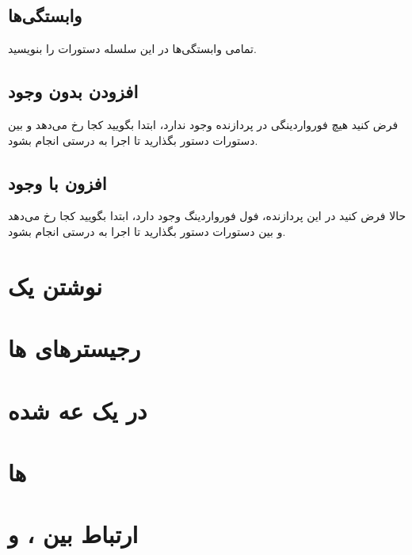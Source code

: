 \documentclass[11pt, dvipsnames, svgnames, x11names]{article}
\begin{document}
\subsection{وابستگی‌ها}
تمامی وابستگی‌ها در این سلسله دستورات را بنویسید.

\subsection{افزودن  بدون وجود }
فرض کنید هیچ فورواردینگی در پردازنده وجود ندارد، ابتدا بگویید کجا
رخ می‌دهد و بین دستورات دستور 
بگذارید تا اجرا به درستی انجام بشود.

\subsection{افزون  با وجود }
حالا فرض کنید در این پردازنده، فول فورواردینگ وجود دارد، ابتدا بگویید کجا
رخ می‌دهد و بین دستورات دستور 
بگذارید تا اجرا به درستی انجام بشود.

\section{نوشتن یک }

\section{رجیستر‌های ها}

\section{ در یک  عه  شده}

\section{ها}

\section{ارتباط بین ،  و }
\end{document}
